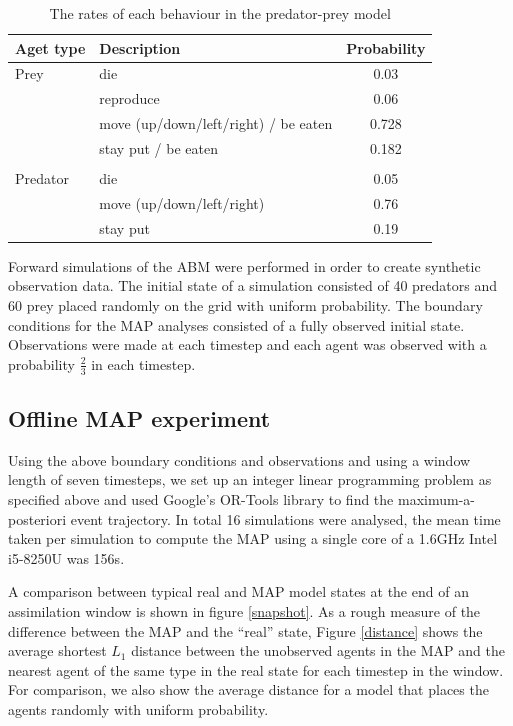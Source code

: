\documentclass{article}
\begin{document}
\begin{table}
\begin{center}
\begin{tabular}{llc}
\hline
Aget type & Description & Probability\\
\hline
Prey & die &        0.03\\
 & reproduce &        0.06\\
 & move (up/down/left/right) / be eaten &        0.728\\
 & stay put / be eaten &  0.182 \\
 &&\\
Predator & die  &      0.05\\
 & move (up/down/left/right)&        0.76\\
 & stay put & 0.19\\
\hline
\end{tabular}
\end{center}
\caption{The rates of each behaviour in the predator-prey model}
\label{rates}
\end{table}



Forward simulations of the ABM were performed in order to create synthetic observation data. The initial state of a simulation consisted of 40 predators and 60 prey placed randomly on the grid with uniform probability. The boundary conditions for the MAP analyses consisted of a fully observed initial state. Observations were made at each timestep and each agent was observed with a probability $\frac{2}{3}$ in each timestep.

\subsection{Offline MAP experiment}

Using the above boundary conditions and observations and using a window length of seven timesteps, we set up an integer linear programming problem as specified above and used Google's OR-Tools\cite{googleortools} library to find the maximum-a-posteriori event trajectory. In total 16 simulations were analysed, the mean time taken per simulation to compute the MAP using a single core of a 1.6GHz Intel i5-8250U was 156s.

A comparison between typical real and MAP model states at the end of an assimilation window is shown in figure \ref{snapshot}. As a rough measure of the difference between the MAP and the ``real'' state, Figure \ref{distance} shows the average shortest $L_1$ distance between the unobserved agents in the MAP and the nearest agent of the same type in the real state for each timestep in the window. For comparison, we also show the average distance for a model that places the agents randomly with uniform probability.
\end{document}
